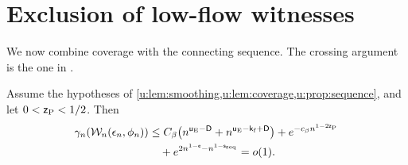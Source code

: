 \section{Exclusion of low-flow witnesses}\label{u:sec:exclusion}

We now combine coverage with the connecting sequence. The crossing
argument is the one in \cite[Section~6, Proposition~7]{oai-typical-upper}.

\begin{proposition}\label{u:prop:witness}
Assume the hypotheses of
\cref{u:lem:smoothing,u:lem:coverage,u:prop:sequence}, and let
$0<\mathsf{z}_{\rm P}<1/2$. Then
\begin{equation}\label{u:eq:witness-decay}
 \begin{split}
 \gamma_n(\mathcal W_n(\epsilon_n,\phi_n))
 &\le C_\beta\bigl(n^{\mathsf{u}_{\rm E}-\mathsf{D}}
                 +n^{\mathsf{u}_{\rm E}-\mathsf{k}_{\rm f}+\mathsf{D}}\bigr)
        +e^{-c_\beta n^{1-2\mathsf{z}_{\rm P}}}\\
 &\quad+e^{2n^{1-\mathsf{e}}-n^{1-\mathsf{s}_{\rm seq}}}=o(1).
 \end{split}
\end{equation}
\end{proposition}


